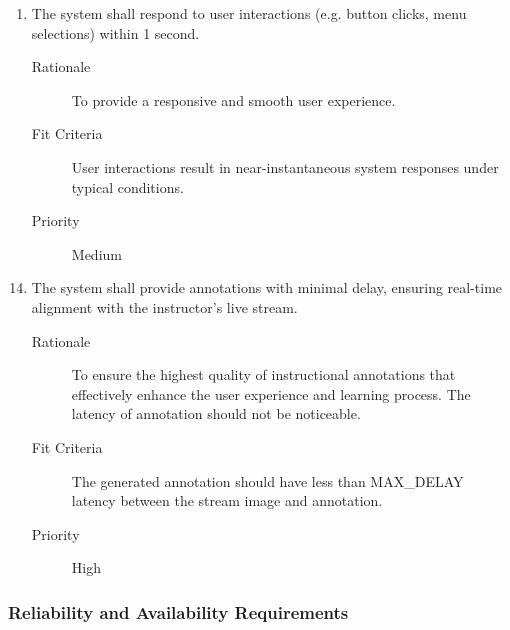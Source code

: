 \documentclass{article}
\begin{document}
\begin{enumerate}[PR1]
\item The system shall respond to user interactions (e.g. button clicks, menu
  selections) within 1 second. \label{PR1}
  \begin{description}
  \item[Rationale] To provide a responsive and smooth user experience.
  \item[Fit Criteria] User interactions result in near-instantaneous system
    responses under typical conditions.
  \item[Priority] Medium
  \end{description}
\end{enumerate}
\begin{enumerate}[label=\textbf{PR\arabic*}]
  \setcounter{enumi}{13}
\item The system shall provide annotations with minimal delay, ensuring real-time
  alignment with the instructor's live stream. \label{PR14}
  \begin{description}
  \item[Rationale] To ensure the highest quality of instructional annotations that
    effectively enhance the user experience and learning process. The latency of
    annotation should not be noticeable.
  \item[Fit Criteria] The generated annotation should have less than MAX\_DELAY
    latency between the stream image and annotation.
  \item[Priority] High
  \end{description}
\end{enumerate}

\subsubsection{Reliability and Availability Requirements}
\end{document}
